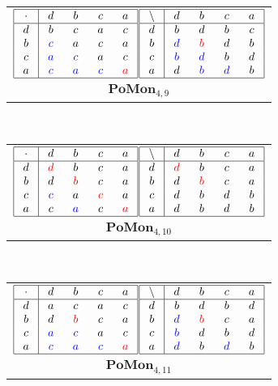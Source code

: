 \documentclass{amsart}
\newcommand{\g}{\textcolor{blue}}
\newcommand{\rd}{\textcolor{red}}
\newcommand{\W}[1]{\makebox[12pt]{$#1$}}%
\begin{document}
\ 
\begin{tabular}[b]{c}
$\begin{array}{|c|cccc|}\hline
\W{\cdot}&\W{d}&\W{b}&\W{c}&\W{a}\\\hline
d&b&c&a&c\\
b&\g{c}&a&c&a\\
c&\g{a}&\g{c}&a&c\\
a&\g{c}&\g{a}&\g{c}&\rd{a}\\
\hline
\end{array}$$\begin{array}{|c|cccc|}\hline
\W{\backslash}&\W{d}&\W{b}&\W{c}&\W{a}\\\hline
d&b&d&b&c\\
b&\g{d}&\rd{b}&d&b\\
c&\g{b}&\g{d}&b&d\\
a&d&\g{b}&\g{d}&b\\
\hline
\end{array}$\\
$\mathbf{PoMon}_{4,9}$
\end{tabular}
\ 
\begin{tabular}[b]{c}
$\begin{array}{|c|cccc|}\hline
\W{\cdot}&\W{d}&\W{b}&\W{c}&\W{a}\\\hline
d&\rd{d}&b&c&a\\
b&d&\rd{b}&c&a\\
c&\g{c}&a&\rd{c}&a\\
a&c&\g{a}&c&\rd{a}\\
\hline
\end{array}$$\begin{array}{|c|cccc|}\hline
\W{\backslash}&\W{d}&\W{b}&\W{c}&\W{a}\\\hline
d&\rd{d}&b&c&a\\
b&d&\rd{b}&c&a\\
c&d&b&d&b\\
a&d&b&d&b\\
\hline
\end{array}$\\
$\mathbf{PoMon}_{4,10}$
\end{tabular}
\ 
\begin{tabular}[b]{c}
$\begin{array}{|c|cccc|}\hline
\W{\cdot}&\W{d}&\W{b}&\W{c}&\W{a}\\\hline
d&a&c&a&c\\
b&d&\rd{b}&c&a\\
c&\g{a}&\g{c}&a&c\\
a&\g{c}&\g{a}&\g{c}&\rd{a}\\
\hline
\end{array}$$\begin{array}{|c|cccc|}\hline
\W{\backslash}&\W{d}&\W{b}&\W{c}&\W{a}\\\hline
d&b&d&b&d\\
b&\g{d}&\rd{b}&c&a\\
c&\g{b}&d&b&d\\
a&\g{d}&b&\g{d}&b\\
\hline
\end{array}$\\
$\mathbf{PoMon}_{4,11}$
\end{tabular}
\end{document}
